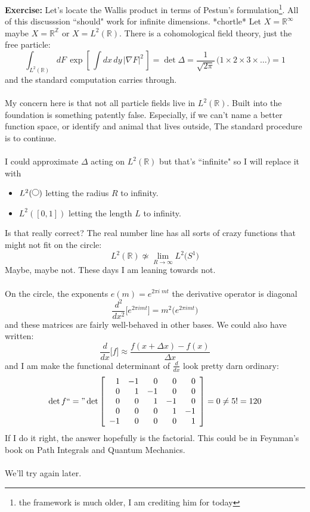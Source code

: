 \documentclass[12pt]{article}
\begin{document}
\newpage

\noindent \textbf{Exercise:} Let's locate the Wallis product in terms of Pestun's formulation\footnote{the framework is much older, I am crediting him for today}.  All of this discusssion ``should" work for infinite dimensions.   *chortle* Let $X = \mathbb{R}^\infty$ maybe $X = \mathbb{R}^\mathbb{Z} $ or $X = L^2(\mathbb{R})$. There is a cohomological field theory, just the free particle:
$$  \int_{L^2(\mathbb{R})} dF \,  \exp \left[ \, \int dx\, dy \, |\nabla F|^2 \, \right] = \det \Delta  = \frac{1}{\sqrt{2\pi}} \, \Big(  1 \times 2 \times 3 \times \dots \Big) = 1$$
and the standard computation carries through. \\ \\
My concern here is that not all particle fields live in $L^2(\mathbb{R})$.  Built into the foundation is something patently false.  Especially, if we can't name a better function space, or identify and animal that lives outside, The standard procedure is to continue. \\ \\
I could approximate $\Delta$ acting on $L^2(\mathbb{R})$ but that's ``infinite" so I will replace it with 
\begin{itemize}
\item $L^2( \begin{tikz} \draw (0,0) circle (4pt); \end{tikz} )$ \hspace{12pt} letting the radius $R$ to infinity.  
\item $L^2( [0,1])$ letting the length $L$ to infinity.  
\end{itemize}
Is that really correct? The real number line has all sorts of crazy functions that might not fit on the circle:
$$ L^2(\mathbb{R}) \not \simeq \lim_{ R \to \infty} L^2 \big( S^1 \big) $$ 
Maybe, maybe not.  These days I am leaning towards not.  \\ \\
On the circle, the exponents $e(m) = e^{2\pi i \; m t}$ the derivative operator is diagonal
$$ \frac{d^2}{dx^2} \big[ e^{2\pi i m t}  \big]  =  m^2  \big( e^{2\pi i m t} \big) $$
and these matrices are fairly well-behaved in other bases.  We could also have written:
$$  \frac{d}{dx} \big[f \big] \approx \frac{f(x+ \Delta x) - f(x)}{\Delta x}$$
and I am make the functional determinant of $\frac{d}{dx}$ look pretty darn ordinary:
$$ \det f ``=" \det \left[ 
\begin{array}{rrrrr}
1 & -1 & 0 & 0 & 0  \\
0 & 1 & -1 & 0 & 0  \\
0 & 0 & 1 & -1 & 0  \\
0 & 0 & 0 & 1 & -1  \\
-1 & 0 & 0 & 0 & 1  \\ 
\end{array}
\right]  = 0 \neq 5! = 120$$
If I do it right, the answer hopefully is the factorial.  This could be in Feynman's book on Path Integrals and Quantum Mechanics. \\ \\
We'll try again later.
\end{document}
